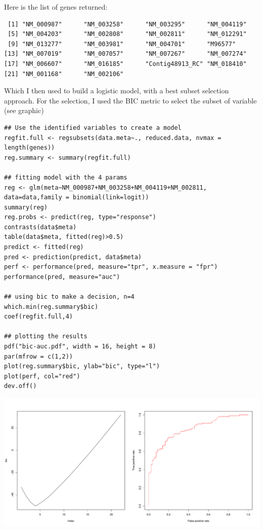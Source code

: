 \documentclass[11pt, a4paper]{article}
\begin{document}
Here is the list of genes returned:


\begin{verbatim}
 [1] "NM_000987"      "NM_003258"      "NM_003295"      "NM_004119"     
 [5] "NM_004203"      "NM_002808"      "NM_002811"      "NM_012291"     
 [9] "NM_013277"      "NM_003981"      "NM_004701"      "M96577"        
[13] "NM_007019"      "NM_007057"      "NM_007267"      "NM_007274"     
[17] "NM_006607"      "NM_016185"      "Contig48913_RC" "NM_018410"     
[21] "NM_001168"      "NM_002106"
\end{verbatim}

Which I then used to build a logistic model, with a best subset
selection approach. For the selection, I used the BIC metric to
select the subset of variable (see graphic)


\begin{verbatim}
## Use the identified variables to create a model
regfit.full <- regsubsets(data.meta~., reduced.data, nvmax = length(genes))
reg.summary <- summary(regfit.full)

## fitting model with the 4 params
reg <- glm(meta~NM_000987+NM_003258+NM_004119+NM_002811, data=data,family = binomial(link=logit))
summary(reg)
reg.probs <- predict(reg, type="response")
contrasts(data$meta)
table(data$meta, fitted(reg)>0.5)
predict <- fitted(reg)
pred <- prediction(predict, data$meta)
perf <- performance(pred, measure="tpr", x.measure = "fpr")
performance(pred, measure="auc")

## using bic to make a decision, n=4
which.min(reg.summary$bic)
coef(regfit.full,4)

## plotting the results
pdf("bic-auc.pdf", width = 16, height = 8)
par(mfrow = c(1,2))
plot(reg.summary$bic, ylab="bic", type="l")
plot(perf, col="red")
dev.off()
\end{verbatim}

\includegraphics[scale=0.4]{bic-auc.pdf}
\end{document}
